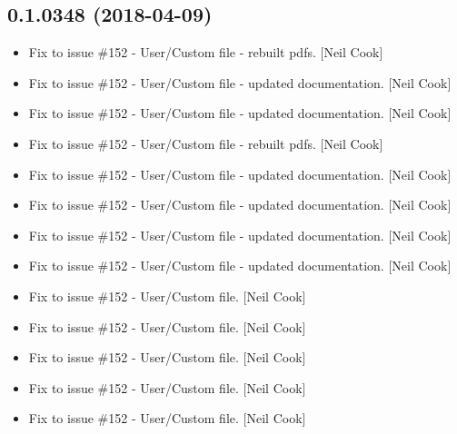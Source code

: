 \documentclass[a4paper,10pt,english]{report}
\begin{document}
\subsection{0.1.0348 (2018-04-09)}
\label{\detokenize{misc/changelog:id466}}\begin{itemize}
\item {} 
Fix to issue \#152 - User/Custom  file - rebuilt pdfs. {[}Neil
Cook{]}

\item {} 
Fix to issue \#152 - User/Custom  file - updated
documentation. {[}Neil Cook{]}

\item {} 
Fix to issue \#152 - User/Custom  file - updated
documentation. {[}Neil Cook{]}

\item {} 
Fix to issue \#152 - User/Custom  file - rebuilt pdfs. {[}Neil
Cook{]}

\item {} 
Fix to issue \#152 - User/Custom  file - updated
documentation. {[}Neil Cook{]}

\item {} 
Fix to issue \#152 - User/Custom  file - updated
documentation. {[}Neil Cook{]}

\item {} 
Fix to issue \#152 - User/Custom  file - updated
documentation. {[}Neil Cook{]}

\item {} 
Fix to issue \#152 - User/Custom  file - updated
documentation. {[}Neil Cook{]}

\item {} 
Fix to issue \#152 - User/Custom  file. {[}Neil Cook{]}

\item {} 
Fix to issue \#152 - User/Custom  file. {[}Neil Cook{]}

\item {} 
Fix to issue \#152 - User/Custom  file. {[}Neil Cook{]}

\item {} 
Fix to issue \#152 - User/Custom  file. {[}Neil Cook{]}

\item {} 
Fix to issue \#152 - User/Custom  file. {[}Neil Cook{]}


\end{itemize}
\end{document}
